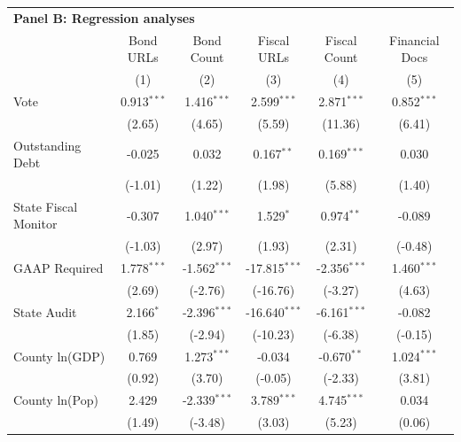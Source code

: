 \begingroup
\centering
\begin{tabular*}{\textwidth}{@{\extracolsep{\fill}}lccccc}
\multicolumn{5}{l}{\textbf{Panel B: Regression analyses}}\\

\addlinespace
   \toprule
                        & Bond URLs     & Bond Count     & Fiscal URLs     & Fiscal Count   & Financial Docs\\  
                        & (1)           & (2)            & (3)             & (4)            & (5)\\  
   \midrule 
   Vote                 & 0.913$^{***}$ & 1.416$^{***}$  & 2.599$^{***}$   & 2.871$^{***}$  & 0.852$^{***}$\\   
                        & (2.65)       & (4.65)        & (5.59)         & (11.36)       & (6.41)\\   
   Outstanding Debt     & -0.025        & 0.032          & 0.167$^{**}$    & 0.169$^{***}$  & 0.030\\   
                        & (-1.01)      & (1.22)        & (1.98)         & (5.88)        & (1.40)\\   
   State Fiscal Monitor & -0.307        & 1.040$^{***}$  & 1.529$^{*}$     & 0.974$^{**}$   & -0.089\\   
                        & (-1.03)      & (2.97)        & (1.93)         & (2.31)        & (-0.48)\\   
   GAAP Required        & 1.778$^{***}$ & -1.562$^{***}$ & -17.815$^{***}$ & -2.356$^{***}$ & 1.460$^{***}$\\   
                        & (2.69)       & (-2.76)       & (-16.76)       & (-3.27)       & (4.63)\\   
   State Audit          & 2.166$^{*}$   & -2.396$^{***}$ & -16.640$^{***}$ & -6.161$^{***}$ & -0.082\\   
                        & (1.85)       & (-2.94)       & (-10.23)       & (-6.38)       & (-0.15)\\   
   County ln(GDP)       & 0.769         & 1.273$^{***}$  & -0.034          & -0.670$^{**}$  & 1.024$^{***}$\\   
                        & (0.92)       & (3.70)        & (-0.05)        & (-2.33)       & (3.81)\\   
   County ln(Pop)       & 2.429         & -2.339$^{***}$ & 3.789$^{***}$   & 4.745$^{***}$  & 0.034\\   
                        & (1.49)       & (-3.48)       & (3.03)         & (5.23)        & (0.06)\\   

\end{tabular*}
